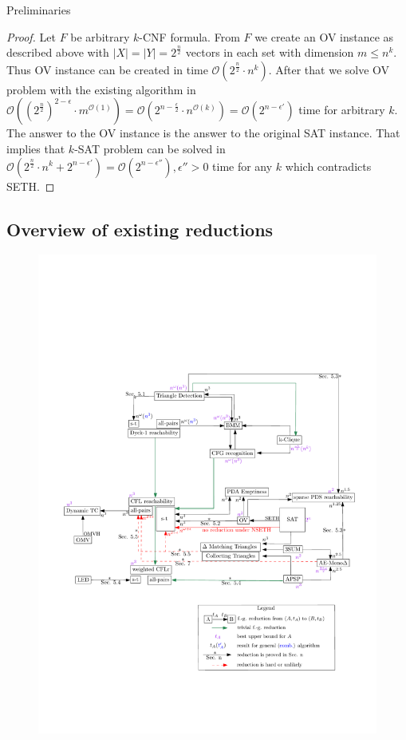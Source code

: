 \documentclass[12pt]{article}
\begin{document}
\begin{section}{Preliminaries}
\begin{proof}
Let $F$ be arbitrary $k$-CNF formula. From $F$ we create an OV instance as described above with $|X|=|Y|=2^{\frac{n}{2}}$ vectors in each set with dimension $m \le n^k$. Thus OV instance can be created in time $\mathcal{O}(2^{\frac{n}{2}} \cdot n^k)$. After that we solve OV problem with the existing algorithm in $\mathcal{O}((2^{\frac{n}{2}})^{2 - \epsilon} \cdot m^{\mathcal{O}(1)}) = \mathcal{O}(2^{n - \frac{\epsilon}{2}} \cdot n^{\mathcal{O}(k)}) = \mathcal{O}(2^{n - \epsilon'})$ time for arbitrary $k$. The answer to the OV instance is the answer to the original SAT instance. That implies that $k$-SAT problem can be solved in $\mathcal{O}(2^{\frac{n}{2}} \cdot n^k + 2^{n - \epsilon'}) = \mathcal{O}(2^{n - \epsilon''}), \epsilon''>0$ time for any $k$ which contradicts SETH. 
\end{proof}

\section{Overview of existing reductions}
\label{sec:map}
 
 \begin{figure}[!htp]
	
		\begin{center}  
			\includegraphics[scale = 0.9]{pictures/map_popl.pdf}
		\end{center}
		

\end{figure}
\end{section}
\end{document}
